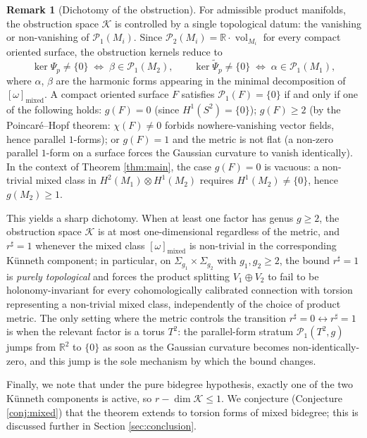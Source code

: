 \documentclass[11pt,reqno]{amsart}
\theoremstyle{plain}
\theoremstyle{definition}
\newtheorem{remark}[theorem]{Remark}
\numberwithin{equation}{section}
\begin{document}
\begin{remark}[Dichotomy of the obstruction]
\label{rmk:dichotomy}
For admissible product manifolds, the obstruction space $\mathcal{K}$ is controlled by a single topological datum: the vanishing or non-vanishing of $\mathcal{P}_1(M_i)$.  Since $\mathcal{P}_2(M_i)=\mathbb{R}\cdot\operatorname{vol}_{M_i}$ for every compact oriented surface, the obstruction kernels reduce to
\[
\ker\Psi_p\neq\{0\}\;\Longleftrightarrow\;\beta\in\mathcal{P}_1(M_2),
\qquad
\ker\widetilde{\Psi}_p\neq\{0\}\;\Longleftrightarrow\;\alpha\in\mathcal{P}_1(M_1),
\]
where $\alpha$, $\beta$ are the harmonic forms appearing in the minimal decomposition of $[\omega]_{\mathrm{mixed}}$. A compact oriented surface $F$ satisfies $\mathcal{P}_1(F)=\{0\}$ if and only if one of the following holds:
$g(F)=0$ (since $H^1(S^2)=\{0\}$); $g(F)\geq 2$ (by the Poincar\'e--Hopf theorem: $\chi(F)\neq 0$ forbids nowhere-vanishing vector fields, hence parallel $1$-forms);
or $g(F)=1$ and the metric is not flat (a non-zero parallel $1$-form on a surface forces the Gaussian curvature to vanish identically).
In the context of Theorem \ref{thm:main}, the case $g(F)=0$ is vacuous: a non-trivial mixed class in $H^2(M_1)\otimes H^1(M_2)$ requires $H^1(M_2)\neq\{0\}$, hence $g(M_2)\geq 1$.

This yields a sharp dichotomy.  When at least one factor has genus $g\geq 2$, the obstruction space $\mathcal{K}$ is at most one-dimensional regardless of the metric, and $r^\sharp=1$ whenever the mixed class $[\omega]_{\mathrm{mixed}}$ is non-trivial in the corresponding K\"unneth component; in particular, on $\Sigma_{g_1}\times\Sigma_{g_2}$ with $g_1,g_2\geq 2$, the bound $r^\sharp=1$ is \emph{purely topological} and forces the product splitting $V_1\oplus V_2$ to fail to be holonomy-invariant for every cohomologically calibrated connection with torsion representing a non-trivial mixed class, independently of the choice of product metric.  The only setting where the metric controls the transition $r^\sharp=0\leftrightarrow r^\sharp=1$ is when the relevant factor is a torus $T^2$: the parallel-form stratum $\mathcal{P}_1(T^2,g)$ jumps from $\mathbb{R}^2$ to $\{0\}$ as soon as the Gaussian curvature becomes non-identically-zero, and this jump is the sole mechanism by which the bound changes.

Finally, we note that under the pure bidegree hypothesis, exactly one of the two K\"unneth components is active, so $r-\dim\mathcal{K}\leq 1$. We conjecture (Conjecture \ref{conj:mixed}) that the theorem extends to torsion forms of mixed bidegree; this is discussed further in Section \ref{sec:conclusion}.
\end{remark}
\end{document}
